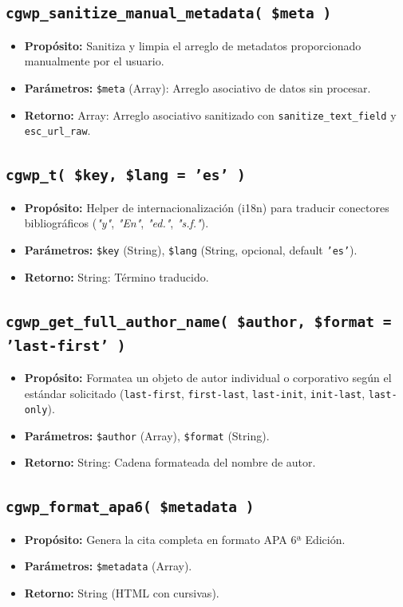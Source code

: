 \documentclass[11pt, a4paper]{article}
\begin{document}
\subsection{\texttt{cgwp\_sanitize\_manual\_metadata( \$meta )}}
\begin{itemize}
\item \textbf{Propósito:} Sanitiza y limpia el arreglo de metadatos proporcionado manualmente por el usuario.
\item \textbf{Parámetros:} \texttt{\$meta} (Array): Arreglo asociativo de datos sin procesar.
\item \textbf{Retorno:} Array: Arreglo asociativo sanitizado con \texttt{sanitize\_text\_field} y \texttt{esc\_url\_raw}.
\end{itemize}
\subsection{\texttt{cgwp\_t( \$key, \$lang = 'es' )}}
\begin{itemize}
\item \textbf{Propósito:} Helper de internacionalización (i18n) para traducir conectores bibliográficos (\textit{"y"}, \textit{"En"}, \textit{"ed."}, \textit{"s.f."}).
\item \textbf{Parámetros:} \texttt{\$key} (String), \texttt{\$lang} (String, opcional, default \texttt{'es'}).
\item \textbf{Retorno:} String: Término traducido.
\end{itemize}
\subsection{\texttt{cgwp\_get\_full\_author\_name( \$author, \$format = 'last-first' )}}
\begin{itemize}
\item \textbf{Propósito:} Formatea un objeto de autor individual o corporativo según el estándar solicitado (\texttt{last-first}, \texttt{first-last}, \texttt{last-init}, \texttt{init-last}, \texttt{last-only}).
\item \textbf{Parámetros:} \texttt{\$author} (Array), \texttt{\$format} (String).
\item \textbf{Retorno:} String: Cadena formateada del nombre de autor.
\end{itemize}
\subsection{\texttt{cgwp\_format\_apa6( \$metadata )}}
\begin{itemize}
\item \textbf{Propósito:} Genera la cita completa en formato APA 6ª Edición.
\item \textbf{Parámetros:} \texttt{\$metadata} (Array).
\item \textbf{Retorno:} String (HTML con cursivas).
\end{itemize}
\end{document}
